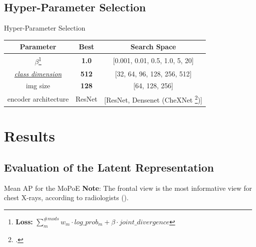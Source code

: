     \subsection{Hyper-Parameter Selection}
    \begin{frame}{Hyper-Parameter Selection}
        \begin{center}
        \begin{table}[]

        \begin{tabular}{ c c c }
         Parameter & Best & Search Space \\ 
         \midrule
         $\beta$\footnote{\textbf{Loss:} $\sum_m^{\#mods} w_m \cdot log\_prob_m + \beta \cdot joint\_divergence $} & \textbf{1.0} & [0.001, 0.01, 0.5, 1.0, 5, 20] \\  
         \hyperlink{mopoe_graph}{\textit{class dimension}} & \textbf{512} & [32, 64, 96, 128, 256, 512]\\
         img size & \textbf{128} & [64, 128, 256]\\
         encoder architecture & ResNet & [ResNet, Densenet (CheXNet \footcite{rajpurkar2017chexnet})]
        \end{tabular}
        \end{table}

        \end{center}

    \end{frame}


    \section{Results}

    \subsection{Evaluation of the Latent Representation}

    \begin{frame}{Mean AP for the MoPoE}
        \pause
        \small{\textbf{Note}: The frontal view is the most informative view for chest X-rays, according to radiologists (\cite{kovaleva2020towards}).}
    \end{frame}

